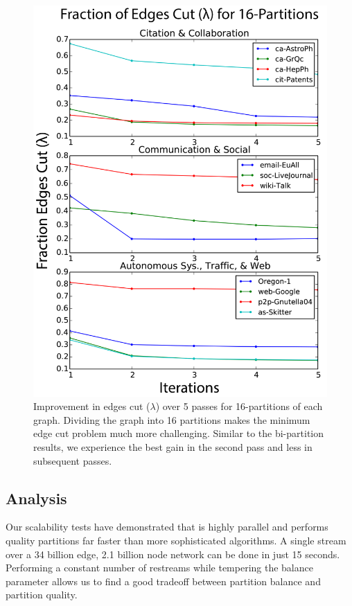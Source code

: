 \begin{figure}[t!]
\centering
\includegraphics[width=0.9\columnwidth] {figures/real_k16_lambda.pdf}
\caption[Caption for]{Improvement in edges cut ($\lambda$) over 5 passes for 16-partitions of each graph. Dividing the graph into 16 partitions makes the minimum edge cut problem much more challenging. Similar to the bi-partition results, we experience the best gain in the second pass and less in subsequent passes.}
\label{fig:k16_lambda}
\end{figure}

\subsection{Analysis}
Our scalability tests have demonstrated that \ourmethod is highly parallel and performs quality partitions far faster than more sophisticated algorithms. A single stream over a 34 billion edge, 2.1 billion node network can be done in just 15 seconds. Performing a constant number of restreams while tempering the balance parameter allows us to find a good tradeoff between partition balance and partition quality. 

